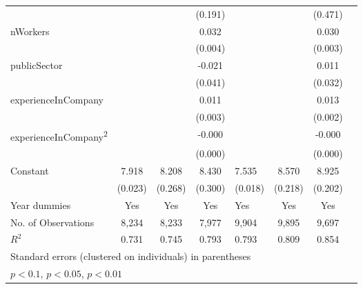 \begin{longtable}{l*{3}{c}|l*{3}{c}}
	&                     &                     &     (0.191)         &                     &                     &     (0.471)         \\
	nWorkers            &                     &                     &       0.032\sym{***}&                     &                     &       0.030\sym{***}\\
	&                     &                     &     (0.004)         &                     &                     &     (0.003)         \\
	publicSector      &                     &                     &      -0.021         &                     &                     &       0.011         \\
	&                     &                     &     (0.041)         &                     &                     &     (0.032)         \\
	experienceInCompany &                     &                     &       0.011\sym{***}&                     &                     &       0.013\sym{***}\\
	&                     &                     &     (0.003)         &                     &                     &     (0.002)         \\
	experienceInCompany\textsuperscript{2} &                     &                     &      -0.000\sym{**} &                     &                     &      -0.000\sym{***}\\
	&                     &                     &     (0.000)         &                     &                     &     (0.000)         \\
	Constant            &       7.918\sym{***}&       8.208\sym{***}&       8.430\sym{***}&       7.535\sym{***}&       8.570\sym{***}&       8.925\sym{***}\\
	&     (0.023)         &     (0.268)         &     (0.300)         &     (0.018)         &     (0.218)         &     (0.202)         \\
	Year dummies        &         Yes         &         Yes         &         Yes         &         Yes         &         Yes         &         Yes         \\
	\midrule
	No. of	Observations        &        8,234         &        8,233         &        7,977         &        9,904         &        9,895         &        9,697         \\
	\(R^{2}\)  &       0.731         &       0.745         &       0.793         &       0.793         &       0.809         &       0.854         \\
	\bottomrule
	\multicolumn{7}{l}{\footnotesize Standard errors (clustered on individuals) in parentheses}\\
	\multicolumn{7}{l}{\footnotesize \sym{*} \(p<0.1\), \sym{**} \(p<0.05\), \sym{***} \(p<0.01\)}
	\label{tab:ru_wage_full}
\end{longtable}